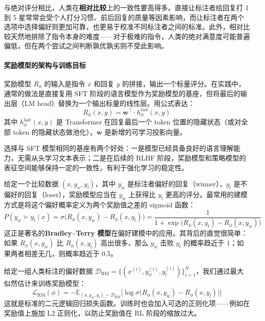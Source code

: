 与绝对评分相比，人类在\textbf{相对比较}上的一致性要高得多。直接让标注者给回复打 1 到 5 星常常会受个人打分习惯、前后回复的质量等因素影响，而让标注者在两个选项中选择偏好则更加可靠，也更易于校准不同标注者之间的标准\cite{stiennon2020learning}。此外，相对比较天然地排除了指令本身的难度——对于极难的指令，人类的绝对满意度可能普遍偏低，但在两个尝试之间判断孰优孰劣则不受此影响。

\paragraph{奖励模型的架构与训练目标}

奖励模型 $R_\phi$ 的输入是指令 $x$ 和回复 $y$ 的拼接，输出一个标量评分。在实践中，通常的做法是直接复用 SFT 阶段的语言模型作为奖励模型的基座，但将最后的输出层（LM head）替换为一个输出标量的线性层。用公式表达：
\begin{equation}
    R_\phi(x, y) = \mathbf{w}^\top \cdot h_\phi^{\text{last}}(x, y)
\end{equation}
其中 $h_\phi^{\text{last}}(x, y)$ 是 Transformer 在回复最后一个 token 位置的隐藏状态（或对全部 token 的隐藏状态做池化），$\mathbf{w}$ 是新增的可学习投影向量。

选择与 SFT 模型相同的基座有两个好处：一是模型已经具备良好的语言理解能力，无需从头学习文本表示；二是在后续的 RLHF 阶段，奖励模型和策略模型的表征空间能够保持一定的一致性，有利于强化学习的稳定性。

给定一个比较数据 $(x, y_w, y_l)$，其中 $y_w$ 是标注者偏好的回复（winner），$y_l$ 是不偏好的回复（loser），奖励模型应当在 $y_w$ 上获得比 $y_l$ 更高的评分。最常用的建模方式是将这个偏好概率定义为两个奖励值之差的 sigmoid 函数：
\begin{equation}\label{eq:bradley_terry}
    P(y_w \succ y_l \mid x) = \sigma\big(R_\phi(x, y_w) - R_\phi(x, y_l)\big) = \frac{1}{1 + \exp\big(R_\phi(x, y_l) - R_\phi(x, y_w)\big)}
\end{equation}
这正是著名的\textbf{Bradley–Terry 模型}在偏好建模中的应用\cite{bradley1952rank}。其背后的直觉很简单：如果 $R_\phi(x, y_w)$ 比 $R_\phi(x, y_l)$ 高出很多，那么 $y_w$ 击败 $y_l$ 的概率趋近于 1；如果两者相差无几，则概率趋近于 0.5。

给定一组人类标注的偏好数据 $\mathcal{D}_{\text{RM}} = \{(x^{(i)}, y_w^{(i)}, y_l^{(i)})\}_{i=1}^{N}$，我们通过最大似然估计来训练奖励模型：
\begin{equation}\label{eq:rm_loss}
    \mathcal{L}_{\text{RM}}(\phi) = -\mathbb{E}_{(x, y_w, y_l) \sim \mathcal{D}_{\text{RM}}}\Big[\log \sigma\big(R_\phi(x, y_w) - R_\phi(x, y_l)\big)\Big]
\end{equation}
这就是标准的二元逻辑回归损失函数。训练时也会加入可选的正则化项——例如在奖励值上施加 L2 正则化，以防止奖励值在 RL 阶段的缩放过大。

